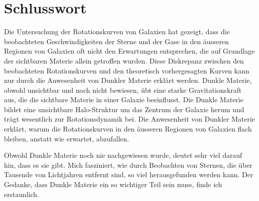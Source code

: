 
\section{Schlusswort}

Die Untersuchung der Rotationskurven von Galaxien hat gezeigt, dass die beobachteten Geschwindigkeiten der Sterne und der Gase in den äusseren Regionen von Galaxien oft nicht den Erwartungen entsprechen, die auf Grundlage der sichtbaren Materie allein getroffen wurden. Diese Diskrepanz zwischen den beobachteten Rotationskurven und den theoretisch vorhergesagten Kurven kann nur durch die Anwesenheit von Dunkler Materie erklärt werden.
Dunkle Materie, obwohl unsichtbar und noch nicht bewiesen, übt eine starke Gravitationskraft aus, die die sichtbare Materie in einer Galaxie beeinflusst. Die Dunkle Materie bildet eine unsichtbare Halo-Struktur um das Zentrum der Galaxie herum und trägt wesentlich zur Rotationsdynamik bei. Die Anwesenheit von Dunkler Materie erklärt, warum die Rotationskurven in den äusseren Regionen von Galaxien flach bleiben, anstatt wie erwartet, abzufallen.

Obwohl Dunkle Materie noch nie nachgewiesen wurde, deutet sehr viel darauf hin, dass es sie gibt. Mich fasziniert, wie durch Beobachten von Sternen, die über Tausende von Lichtjahren entfernt sind, so viel herausgefunden werden kann.
Der Gedanke, dass Dunkle Materie ein so wichtiger Teil sein muss, finde ich erstaunlich.
 







